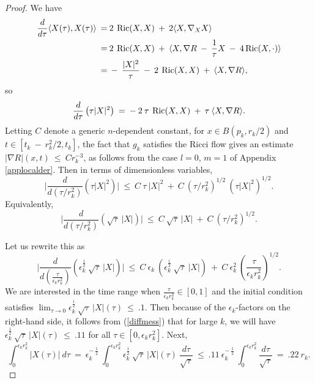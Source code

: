 \begin{proof}
We have
\begin{align}
\frac{d}{d\tau} \langle X(\tau), X(\tau) \rangle \: = \:
& 2 \: \operatorname{Ric}(X, X) \: + \: 2 \langle X, \nabla_X X \rangle \\
\: = \: &
2 \: \operatorname{Ric}(X, X) \: + \: \langle X,
\nabla R \: - \: \frac{1}{\tau} X \: - \: 4 \operatorname{Ric}(X, \cdot)
 \rangle \notag \\
\: = \: &
 - \: \frac{|X|^2}{\tau} \: - \: 2 \: \operatorname{Ric}(X, X) \: + \: \langle X,
\nabla R \rangle, \notag
\end{align}
so
\begin{equation}
\frac{d}{d\tau} \left( \tau |X|^2 \right) \: = \:
- \: 2 \: \tau \: \operatorname{Ric}(X, X) \: + \: \tau \: \langle X,
\nabla R \rangle.
\end{equation}
Letting $C$ denote a generic $n$-dependent constant,
for $x \in B(p_k, r_k/2)$ and $t \in [t_k \: - \: r_k^2/2,
t_k]$, the fact that $g_k$ satisfies the Ricci flow gives
an estimate $|\nabla R|(x, t) \: \le \: C r_k^{-3}$, as follows
from the case $l=0$, $m=1$ of
Appendix \ref{applocalder}.
Then in terms of dimensionless variables,
\begin{equation}
\Big| \frac{d}{d(\tau/r_k^2)} \left( \tau |X|^2 \right) \Big| \: \le \:
C \: \tau \: |X|^2 \: + \: C \: (\tau/r_k^2)^{1/2} \:
(\tau |X|^2)^{1/2}.
\end{equation}
Equivalently,
\begin{equation}
\Big| \frac{d}{d(\tau/r_k^2)} \left( \sqrt{\tau} \:
|X| \right) \Big| \: \le \:
C \: \sqrt{\tau} \: |X| \: + \: C \: \left(
\tau/r_k^2 \right)^{1/2}.
\end{equation}

Let us rewrite this as
\begin{equation} \label{diffmess}
\Big| \frac{d}{d( \frac{\tau}{\epsilon_k r_k^2})} \left(
\epsilon_k^{\frac12} \: \sqrt{\tau} \:
|X| \right) \Big| \: \le \:
C \: \epsilon_k \: \left( \epsilon_k^{\frac12} \: \sqrt{\tau} \: |X| \right)
\: + \: C \: \epsilon_k^2 \: \left(
\frac{\tau}{\epsilon_k r_k^2} \right)^{1/2}.
\end{equation}
We are interested in the time range when $\frac{\tau}{\epsilon_k r_k^2}
\in [0,1]$ and the initial condition satisfies
$\lim_{\tau \rightarrow 0} \epsilon_k^{\frac12} \: \sqrt{\tau} \:
|X|(\tau) \: \le \: .1$. Then because of the $\epsilon_k$-factors
on the right-hand side, it follows from (\ref{diffmess})
that for large $k$, we will have $\epsilon_k^{\frac12} \: \sqrt{\tau} \:
|X|(\tau) \: \le \: .11$ for all $\tau \in [0, \epsilon_k r_k^2]$.
Next,
\begin{equation}
\int_0^{\epsilon_k r_k^2} |X(\tau)| \: d\tau \: = \:
\epsilon_k^{- \: \frac12} \: \int_0^{\epsilon_k r_k^2}
\epsilon_k^{\frac12} \: \sqrt{\tau} \:
|X|(\tau) \: \frac{d\tau}{\sqrt{\tau}} \: \le \:
.11 \:
\epsilon_k^{- \: \frac12} \: \int_0^{\epsilon_k r_k^2}
\frac{d\tau}{\sqrt{\tau}} \: = \: .22 \: r_k.
\end{equation}


\end{proof}
